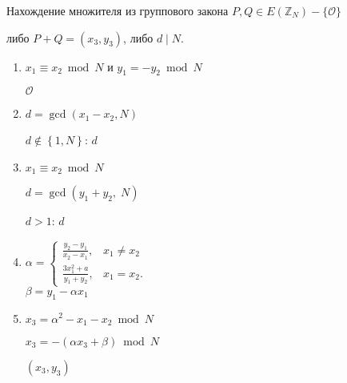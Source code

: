 \documentclass{beamer}
\begin{document}
\begin{frame}{Нахождение множителя из группового закона}
     $P, Q \in E( \mathbb{Z}_N ) - \{\mathcal{O}\}$
    
     либо $P + Q = ( x_3,y_3 )$, либо $d \mid N$. 
    
    \begin{enumerate}
        \item {} $x_1 \equiv x_2\bmod N$ и $y_1 =  - y_2\bmod N$
        
        \quad {} $\mathcal{O}$
        
        \item $d = \gcd(x_1 - x_2, N)$

        \quad {} $d\not  \in \left\{1,N\right\}$:  $d$
        
        \item {} $x_1 \equiv x_2\bmod N$
        
        \quad $d = \gcd (y_1 + y_2,\;N)$
        
        \quad {} $d > 1$:  $d$
        
        \item 
        $
        \alpha =
        \begin{cases}
             \frac{y_2 - y_1}{x_2 - x_1},& x_1 \ne x_2 \\
            \frac{3x_1^2 + a}{y_1 + y_2},& x_1 = x_2.
        \end{cases}
        $\\
        $
        \beta  = y_1 - \alpha x_1
        $
        
        \item $x_3 = \alpha ^2 - x_1 - x_2\bmod N$
        
        $x_3 =  - ( \alpha x_3 + \beta  )\bmod N$
        
         $( x_3, y_3 )$
        
    \end{enumerate}
\end{frame}
\end{document}

